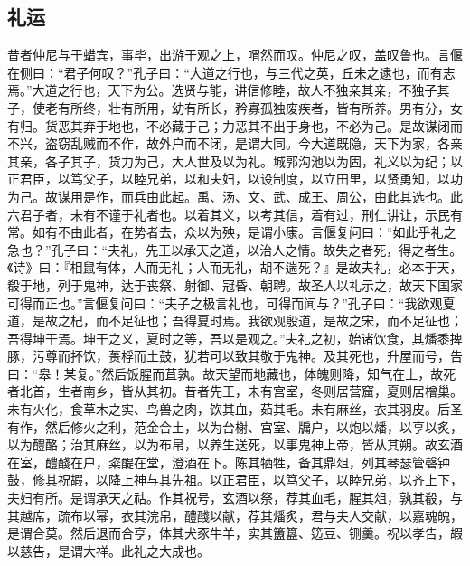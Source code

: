 \documentclass[]{article}
\begin{document}
\hypertarget{header-n401}{%
\subsection{礼运}\label{header-n401}}

昔者仲尼与于蜡宾，事毕，出游于观之上，喟然而叹。仲尼之叹，盖叹鲁也。言偃在侧曰：``君子何叹？''孔子曰：``大道之行也，与三代之英，丘未之逮也，而有志焉。''大道之行也，天下为公。选贤与能，讲信修睦，故人不独亲其亲，不独子其子，使老有所终，壮有所用，幼有所长，矜寡孤独废疾者，皆有所养。男有分，女有归。货恶其弃于地也，不必藏于己；力恶其不出于身也，不必为己。是故谋闭而不兴，盗窃乱贼而不作，故外户而不闭，是谓大同。今大道既隐，天下为家，各亲其亲，各子其子，货力为己，大人世及以为礼。城郭沟池以为固，礼义以为纪；以正君臣，以笃父子，以睦兄弟，以和夫妇，以设制度，以立田里，以贤勇知，以功为己。故谋用是作，而兵由此起。禹、汤、文、武、成王、周公，由此其选也。此六君子者，未有不谨于礼者也。以着其义，以考其信，着有过，刑仁讲让，示民有常。如有不由此者，在势者去，众以为殃，是谓小康。言偃复问曰：``如此乎礼之急也？''孔子曰：``夫礼，先王以承天之道，以治人之情。故失之者死，得之者生。《诗》曰：『相鼠有体，人而无礼；人而无礼，胡不遄死？』是故夫礼，必本于天，殽于地，列于鬼神，达于丧祭、射御、冠昏、朝聘。故圣人以礼示之，故天下国家可得而正也。''言偃复问曰：``夫子之极言礼也，可得而闻与？''孔子曰：``我欲观夏道，是故之杞，而不足征也；吾得夏时焉。我欲观殷道，是故之宋，而不足征也；吾得坤干焉。坤干之义，夏时之等，吾以是观之。''夫礼之初，始诸饮食，其燔黍捭豚，污尊而抔饮，蒉桴而土鼓，犹若可以致其敬于鬼神。及其死也，升屋而号，告曰：``皋！某复。''然后饭腥而苴孰。故天望而地藏也，体魄则降，知气在上，故死者北首，生者南乡，皆从其初。昔者先王，未有宫室，冬则居营窟，夏则居橧巢。未有火化，食草木之实、鸟兽之肉，饮其血，茹其毛。未有麻丝，衣其羽皮。后圣有作，然后修火之利，范金合土，以为台榭、宫室、牖户，以炮以燔，以亨以炙，以为醴酪；治其麻丝，以为布帛，以养生送死，以事鬼神上帝，皆从其朔。故玄酒在室，醴醆在户，粢醍在堂，澄酒在下。陈其牺牲，备其鼎俎，列其琴瑟管磬钟鼓，修其祝嘏，以降上神与其先祖。以正君臣，以笃父子，以睦兄弟，以齐上下，夫妇有所。是谓承天之祜。作其祝号，玄酒以祭，荐其血毛，腥其俎，孰其殽，与其越席，疏布以幂，衣其浣帛，醴醆以献，荐其燔炙，君与夫人交献，以嘉魂魄，是谓合莫。然后退而合亨，体其犬豕牛羊，实其簠簋、笾豆、铏羹。祝以孝告，嘏以慈告，是谓大祥。此礼之大成也。
\end{document}
